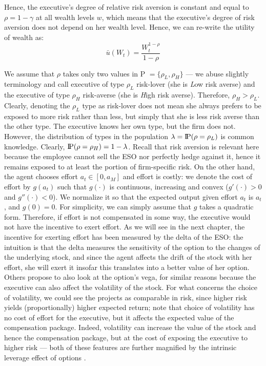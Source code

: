 Hence, the executive's degree of relative risk aversion is constant and equal to $\rho = 1-\gamma$ at all wealth levels $w$, which means that the executive's degree of risk aversion does not depend on her wealth level. Hence, we can re-write the utility of wealth as:
$$ \bar{u}(W_t) = \frac{W_t^{1-\rho}}{1-\rho} $$

We assume that $\rho$ takes only two values in P $= \{\rho_L, \rho_H \}$ --- we abuse slightly terminology and call executive of type $\rho_L$ risk-lover (she is \textit{L}ow risk averse) and the executive of type $\rho_H$ risk-averse (she is \textit{H}igh risk averse). Therefore, $\rho_H > \rho_L$. Clearly, denoting the $\rho_L$ type as risk-lover does not mean she always prefers to be exposed to more risk rather than less, but simply that she is less risk averse than the other type. The executive knows her own type, but the firm does not. However, the distribution of types in the population $\lambda = \text{I\kern-0.15em P}(\rho = \rho_L)$ is common knowledge. Clearly, $\text{I\kern-0.15em P}(\rho = \rho_H) = 1 - \lambda$. Recall that risk aversion is relevant here because the employee cannot sell the ESO nor perfectly hedge against it, hence it remains exposed to at least the portion of firm-specific risk.
On the other hand, the agent chooses effort $a_t \in [0, a_M]$ and effort is costly: we denote the cost of effort by $g(a_t)$ such that $g(\cdot)$ is continuous, increasing and convex ($g'(\cdot) > 0$ and $g''(\cdot)<0$). We normalize it so that the expected output given effort $a_t$ is $a_t$, and $g(0) = 0$. For simplicity, we can simply assume that $g$ takes a quadratic form. Therefore, if effort is not compensated in some way, the executive would not have the incentive to exert effort. 
As we will see in the next chapter, the incentive for exerting effort has been measured by the delta of the ESO: the intuition is that the delta measures the sensitivity of the option to the changes of the underlying stock, and since the agent affects the drift of the stock with her effort, she will exert it insofar this translates into a better value of her option. Others propose to also look at the option's vega, for similar reasons because the executive can also affect the volatility of the stock. For what concerns the choice of volatility, we could see the projects as comparable in risk, since higher risk yields (proportionally) higher expected return; note that choice of volatility has no cost of effort for the executive, but it affects the expected value of the compensation package. Indeed, volatility can increase the value of the stock and hence the compensation package, but at the cost of exposing the executive to higher risk --- both of these features are further magnified by the intrinsic leverage effect of options \cite{cadenillas2005executive}.

